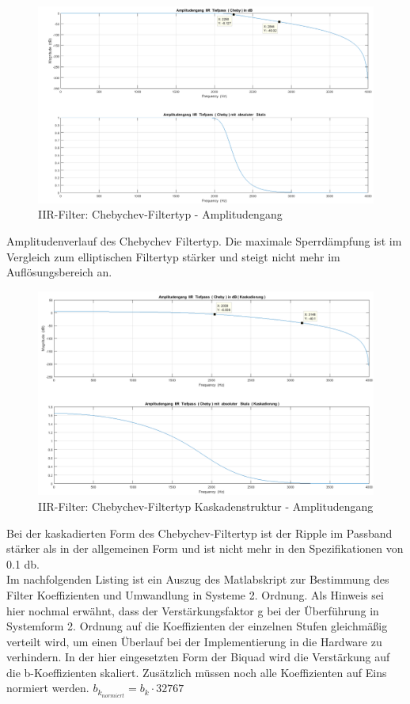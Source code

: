 \begin{figure}[h]
\centering
\includegraphics[width=0.7\linewidth]{Bilder/Attachment_A_CHEBY}
\caption{IIR-Filter: Chebychev-Filtertyp - Amplitudengang}
\label{fig:Attachment_A_CHEBY}
\end{figure}
\noindent Amplitudenverlauf des Chebychev Filtertyp. Die maximale Sperrdämpfung ist im Vergleich zum elliptischen Filtertyp stärker und steigt nicht mehr im Auflösungsbereich an.

\clearpage

\begin{figure}[h]
\centering
\includegraphics[width=0.7\linewidth]{Bilder/Attachment_A_CHEBY_KASKADE}
\caption{IIR-Filter: Chebychev-Filtertyp Kaskadenstruktur - Amplitudengang}
\label{fig:Attachment_A_CHEBY_KASKADE}
\end{figure}
\noindent Bei der kaskadierten Form des Chebychev-Filtertyp ist der Ripple im Passband stärker als in der allgemeinen Form und ist nicht mehr in den Spezifikationen von 0.1 db.\\

\noindent Im nachfolgenden Listing ist ein Auszug des Matlabskript zur Bestimmung des Filter Koeffizienten und Umwandlung in Systeme 2. Ordnung. Als Hinweis sei hier nochmal erwähnt, dass der Verstärkungsfaktor g bei der Überführung in Systemform 2. Ordnung auf die Koeffizienten der einzelnen Stufen gleichmäßig verteilt wird, um einen Überlauf bei der Implementierung in die Hardware zu verhindern. In der hier eingesetzten Form der Biquad wird die Verstärkung auf die b-Koeffizienten skaliert. Zusätzlich müssen noch alle Koeffizienten auf Eins normiert werden. $b_{k_{normiert}} = b_{k} \cdot 32767$\\

